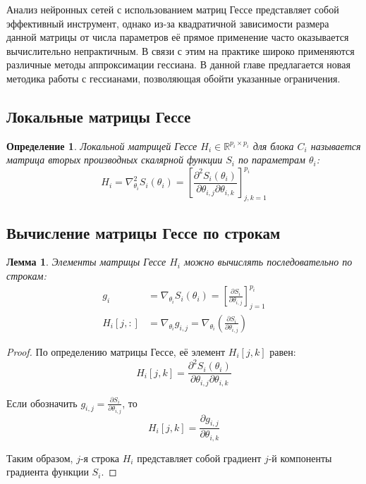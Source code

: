 \documentclass[a4paper,12pt]{article}
\newtheorem{lemma}{Лемма}
\newtheorem{definition}{Определение}
\begin{document}
Анализ нейронных сетей с использованием матриц Гессе представляет собой эффективный инструмент, однако из-за квадратичной зависимости размера данной матрицы от числа параметров её прямое применение часто оказывается вычислительно непрактичным. В связи с этим на практике широко применяются различные методы аппроксимации гессиана. В данной главе предлагается новая методика работы с гессианами, позволяющая обойти указанные ограничения.

\subsection{Локальные матрицы Гессе}

\begin{definition}
Локальной матрицей Гессе $H_i \in \mathbb{R}^{p_i \times p_i}$ для блока $C_i$ называется матрица вторых производных скалярной функции $S_i$ по параметрам $\theta_i$:
\begin{equation}
    H_i = \nabla_{\theta_i}^2 S_i(\theta_i) = \left[ \frac{\partial^2 S_i(\theta_i)}{\partial \theta_{i,j} \partial \theta_{i,k}} \right]_{j,k=1}^{p_i}
\end{equation}
\end{definition}

\subsection{Вычисление матрицы Гессе по строкам}

\begin{lemma}
Элементы матрицы Гессе $H_i$ можно вычислять последовательно по строкам:
\begin{equation}
\begin{aligned}
    g_i &= \nabla_{\theta_i} S_i(\theta_i) = \left[ \frac{\partial S_i}{\partial \theta_{i,j}} \right]_{j=1}^{p_i} \\
    H_i[j,:] &= \nabla_{\theta_i} g_{i,j} = \nabla_{\theta_i} \left( \frac{\partial S_i}{\partial \theta_{i,j}} \right)
\end{aligned}
\end{equation}
\end{lemma}

\begin{proof}
По определению матрицы Гессе, её элемент $H_i[j,k]$ равен:
\begin{equation}
    H_i[j,k] = \frac{\partial^2 S_i(\theta_i)}{\partial \theta_{i,j} \partial \theta_{i,k}}
\end{equation}

Если обозначить $g_{i,j} = \frac{\partial S_i}{\partial \theta_{i,j}}$, то 
\begin{equation}
    H_i[j,k] = \frac{\partial g_{i,j}}{\partial \theta_{i,k}}
\end{equation}

Таким образом, $j$-я строка $H_i$ представляет собой градиент $j$-й компоненты градиента функции $S_i$.
\end{proof}
\end{document}
